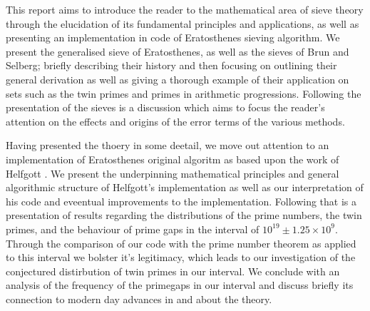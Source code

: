 This report aims to introduce the reader to the mathematical area of sieve theory through the elucidation of its fundamental principles and applications, as well as presenting an implementation in code of Eratosthenes sieving algorithm. 
We present the generalised sieve of Eratosthenes, as well as the sieves of Brun and Selberg; briefly describing their history and then focusing on outlining their general derivation as well as giving a thorough example of their application on sets such as the twin primes and primes in arithmetic progressions. 
Following the presentation of the sieves is a discussion which aims to focus the reader's attention on the effects and origins of the error terms of the various methods.

Having presented the thoery in some deetail, we move out attention to an implementation of Eratosthenes original algoritm as based upon the work of Helfgott \cite{HaraldSieve}.
We present the underpinning mathematical principles and general algorithmic structure of Helfgott's implementation as well as our interpretation of his code and eveentual improvements to the implementation.
Following that is a presentation of results regarding the distributions of the prime numbers, the twin primes, and the behaviour of prime gaps in the interval of \(10^{19}\pm 1.25\times10^9\).
Through the comparison of our code with the prime number theorem as applied to this interval we bolster it's legitimacy, which leads to our investigation of the conjectured distirbution of twin primes in our interval.
We conclude with an analysis of the frequency of the primegaps in our interval and discuss briefly its connection to modern day advances in and about the theory.